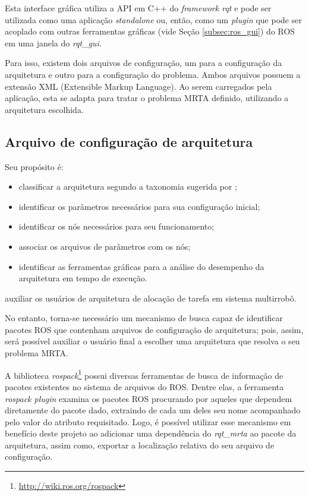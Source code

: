         Esta interface gráfica utiliza a API em C++ do \textit{framework rqt} e pode ser utilizada como uma aplicação \textit{standalone} ou, então, como um \textit{plugin} que pode ser acoplado com outras ferramentas gráficas (vide Seção \ref{subsec:ros_gui}) do ROS em uma janela do \textit{rqt\_gui}.
        
        Para isso, existem dois arquivos de configuração, um para a configuração da arquitetura e outro para a configuração do problema. Ambos arquivos possuem a extensão XML (Extensible Markup Language). Ao serem carregados pela aplicação, esta se adapta para tratar o problema MRTA definido, utilizando a arquitetura escolhida. 
        
        \subsection{Arquivo de configuração de arquitetura} \label{subsec:arch_config}
            Seu propósito é:
            
            \begin{itemize}
                \item classificar a arquitetura segundo a taxonomia sugerida por ;
                \item identificar os parâmetros necessários para sua configuração inicial;
                \item identificar os nós necessários para seu funcionamento;
                \item associar os arquivos de parâmetros com os nós;
                \item identificar as ferramentas gráficas para a análise do desempenho da arquitetura em tempo de execução.
            \end{itemize}
            
            auxiliar os usuários de arquitetura de alocação de tarefa em sistema multirrobô.
            
            No entanto, torna-se necessário um mecanismo de busca capaz de identificar pacotes ROS que contenham arquivos de configuração de arquitetura; pois, assim, será possível auxiliar o usuário final a escolher uma arquitetura que resolva o seu problema MRTA.
            
            A biblioteca \textit{rospack}\footnote{\url{http://wiki.ros.org/rospack}} possui diversas ferramentas de busca de informação de pacotes existentes no sistema de arquivos do ROS. Dentre elas, a ferramenta \textit{rospack plugin} examina os pacotes ROS procurando por aqueles que dependem diretamente do pacote dado, extraindo de cada um deles seu nome acompanhado pelo valor do atributo requisitado. Logo, é possível utilizar esse mecanismo em benefício deste projeto ao adicionar uma dependência do \textit{rqt\_mrta} ao pacote da arquitetura, assim como, exportar a localização relativa do seu arquivo de configuração. 
            
